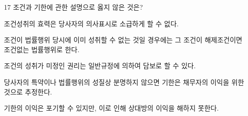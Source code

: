\begin{question}{17}
조건과 기한에 관한 설명으로 옳지 않은 것은?
\begin{choices}
  \item 조건성취의 효력은 당사자의 의사표시로 소급하게 할 수 없다.
  \item 조건이 법률행위 당시에 이미 성취할 수 없는 것일 경우에는 그 조건이 해제조건이면 조건없는 법률행위로 한다.
  \item 조건의 성취가 미정인 권리는 일반규정에 의하여 담보로 할 수 있다.
  \item 당사자의 특약이나 법률행위의 성질상 분명하지 않으면 기한은 채무자의 이익을 위한 것으로 추정한다.
  \item 기한의 이익은 포기할 수 있지만, 이로 인해 상대방의 이익을 해하지 못한다.
\end{choices}
\end{question}
